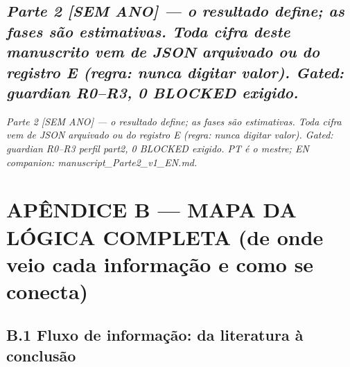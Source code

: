 \documentclass[
  12pt,
]{report}
\begin{document}
\hypertarget{parte-2-sem-ano-o-resultado-define-as-fases-suxe3o-estimativas.-toda-cifra-deste-manuscrito-vem-de-json-arquivado-ou-do-registro-e-regra-nunca-digitar-valor.-gated-guardian-r0r3-0-blocked-exigido.}{%
\section{\texorpdfstring{\emph{Parte 2 {[}SEM ANO{]} --- o resultado
define; as fases são estimativas. Toda cifra deste manuscrito vem de
JSON arquivado ou do registro E (regra: nunca digitar valor). Gated:
guardian R0--R3, 0 BLOCKED
exigido.}}{Parte 2 {[}SEM ANO{]} --- o resultado define; as fases são estimativas. Toda cifra deste manuscrito vem de JSON arquivado ou do registro E (regra: nunca digitar valor). Gated: guardian R0--R3, 0 BLOCKED exigido.}}\label{parte-2-sem-ano-o-resultado-define-as-fases-suxe3o-estimativas.-toda-cifra-deste-manuscrito-vem-de-json-arquivado-ou-do-registro-e-regra-nunca-digitar-valor.-gated-guardian-r0r3-0-blocked-exigido.}}

\emph{Parte 2 {[}SEM ANO{]} --- o resultado define; as fases são
estimativas. Toda cifra vem de JSON arquivado ou do registro E (regra:
nunca digitar valor). Gated: guardian R0--R3 perfil part2, 0 BLOCKED
exigido. PT é o mestre; EN companion: manuscript\_Parte2\_v1\_EN.md.}

\hypertarget{apuxeandice-b-mapa-da-luxf3gica-completa-de-onde-veio-cada-informauxe7uxe3o-e-como-se-conecta}{%
\chapter{APÊNDICE B --- MAPA DA LÓGICA COMPLETA (de onde veio cada
informação e como se
conecta)}\label{apuxeandice-b-mapa-da-luxf3gica-completa-de-onde-veio-cada-informauxe7uxe3o-e-como-se-conecta}}

\hypertarget{b.1-fluxo-de-informauxe7uxe3o-da-literatura-uxe0-conclusuxe3o}{%
\section{B.1 Fluxo de informação: da literatura à
conclusão}\label{b.1-fluxo-de-informauxe7uxe3o-da-literatura-uxe0-conclusuxe3o}}
\end{document}
